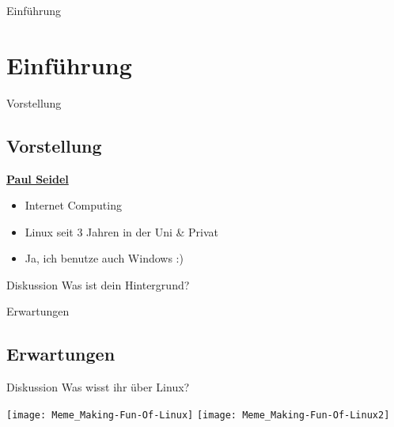 
\begin{frame}{Einführung}
    \section{Einführung}\label{sec:einfuhrung}
\end{frame}

\begin{frame}{Vorstellung}
    \subsection{Vorstellung}\label{subsec:vorstellung}

    \pause

    \underline{\textbf{Paul Seidel}}\pause

    \begin{itemize}
        \item Internet Computing\pause
        \item Linux seit 3 Jahren in der Uni \& Privat\pause
        \item Ja, ich benutze auch Windows :)
    \end{itemize}

    \pause
    \vspace{0.5cm}
    \begin{alertblock}{Diskussion}
        Was ist dein Hintergrund?
    \end{alertblock}

\end{frame}
\begin{frame}{Erwartungen}
    \subsection{Erwartungen}\label{subsec:erwartungen}
    \begin{alertblock}{Diskussion}
        Was wisst ihr über Linux?
    \end{alertblock}

    \pause
        \texttt{[image: Meme\_Making-Fun-Of-Linux]}
    \endminipage\hfill
    \pause
        \texttt{[image: Meme\_Making-Fun-Of-Linux2]}
    \endminipage\hfill
\end{frame}

